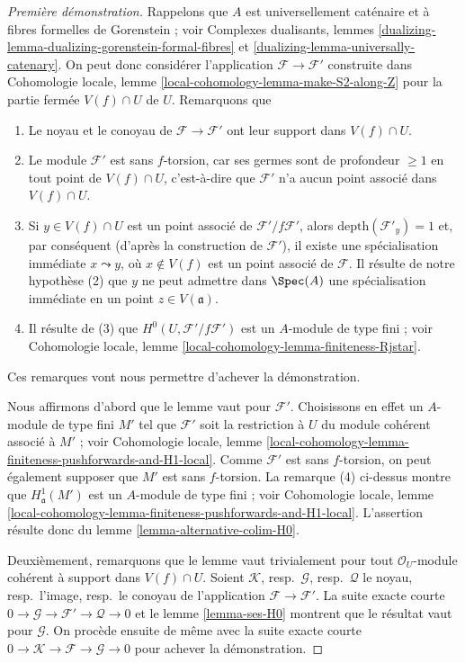 \begin{proof}[Première démonstration]
Rappelons que $A$ est universellement caténaire et à fibres formelles
de Gorenstein ; voir Complexes dualisants, lemmes
\ref{dualizing-lemma-dualizing-gorenstein-formal-fibres} et
\ref{dualizing-lemma-universally-catenary}. On peut donc considérer l'application
$\mathcal{F} \to \mathcal{F}'$ construite dans
Cohomologie locale, lemme \ref{local-cohomology-lemma-make-S2-along-Z}
pour la partie fermée $V(f) \cap U$ de $U$.
Remarquons que
\begin{enumerate}
\item Le noyau et le conoyau de $\mathcal{F} \to \mathcal{F}'$
ont leur support dans $V(f) \cap U$.
\item Le module $\mathcal{F}'$ est sans $f$-torsion, car ses germes sont de
profondeur $\geq 1$ en tout point de $V(f) \cap U$, c'est-à-dire que $\mathcal{F}'$
n'a aucun point associé dans $V(f) \cap U$.
\item Si $y \in V(f) \cap U$ est un point associé de
$\mathcal{F}'/f\mathcal{F}'$, alors
$\text{depth}(\mathcal{F}'_y) = 1$
et, par conséquent (d'après la construction de $\mathcal{F}'$),
il existe une spécialisation immédiate $x \leadsto y$,
où $x \not \in V(f)$ est un point associé de $\mathcal{F}$.
Il résulte de notre hypothèse (2) que $y$ ne peut admettre
dans $\Spec(A)$ une spécialisation immédiate
en un point $z \in V(\mathfrak a)$.
\item Il résulte de (3) que $H^0(U, \mathcal{F}'/f\mathcal{F}')$
est un $A$-module de type fini ; voir
Cohomologie locale, lemme \ref{local-cohomology-lemma-finiteness-Rjstar}.
\end{enumerate}
Ces remarques vont nous permettre d'achever la démonstration.

\medskip\noindent
Nous affirmons d'abord que le lemme vaut pour $\mathcal{F}'$.
Choisissons en effet un $A$-module de type fini $M'$ tel que $\mathcal{F}'$
soit la restriction
à $U$ du module cohérent associé à $M'$ ; voir Cohomologie locale,
lemme \ref{local-cohomology-lemma-finiteness-pushforwards-and-H1-local}.
Comme $\mathcal{F}'$ est sans $f$-torsion, on peut également supposer que $M'$
est sans $f$-torsion. La remarque (4) ci-dessus montre que
$H^1_\mathfrak a(M')$ est un $A$-module de type fini ; voir Cohomologie locale,
lemme \ref{local-cohomology-lemma-finiteness-pushforwards-and-H1-local}.
L'assertion résulte donc du lemme \ref{lemma-alternative-colim-H0}.

\medskip\noindent
Deuxièmement, remarquons que le lemme vaut trivialement pour tout
$\mathcal{O}_U$-module cohérent à support dans $V(f) \cap U$.
Soient $\mathcal{K}$, resp.\ $\mathcal{G}$, resp.\ $\mathcal{Q}$
le noyau, resp.\ l'image, resp.\ le conoyau de l'application
$\mathcal{F} \to \mathcal{F}'$.
La suite exacte courte
$0 \to \mathcal{G} \to \mathcal{F}' \to \mathcal{Q} \to 0$
et le lemme \ref{lemma-ses-H0} montrent que le résultat vaut pour
$\mathcal{G}$. On procède ensuite de même avec la suite exacte courte
$0 \to \mathcal{K} \to \mathcal{F} \to \mathcal{G} \to 0$
pour achever la démonstration.
\end{proof}


